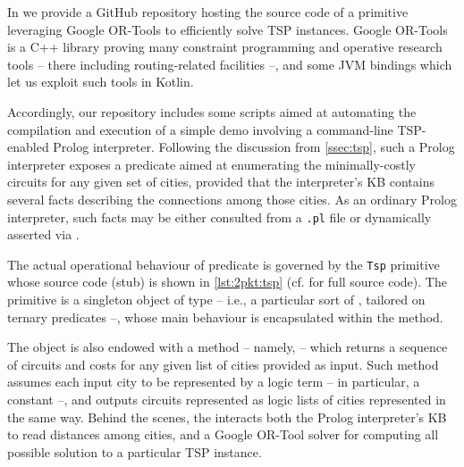 \documentclass[12pt,a4paper,openright,twoside]{book}
\begin{document}
In \cite{2P-Kt-TSP-Example} we provide a GitHub repository hosting the source code of a \twopkt{} primitive leveraging Google OR-Tools \cite{ortools} to efficiently solve TSP instances.
%
Google OR-Tools is a C++ library proving many constraint programming and operative research tools -- there including routing-related facilities --, and some JVM bindings which let us exploit such tools in Kotlin.

Accordingly, our repository includes some scripts aimed at automating the compilation and execution of a simple demo involving a command-line TSP-enabled Prolog interpreter.
%
Following the discussion from \cref{ssec:tsp}, such a Prolog interpreter exposes a  predicate aimed at enumerating the minimally-costly circuits for any given set of cities, provided that the interpreter's KB contains several  facts describing the connections among those cities.
%
As an ordinary Prolog interpreter, such facts may be either consulted from a \texttt{.pl} file or dynamically asserted via .



The actual operational behaviour of predicate  is governed by the \texttt{Tsp} primitive whose source code (stub) is shown in \cref{lst:2pkt:tsp} (cf. \cite{2P-Kt-TSP-Example} for full source code).
%
The  primitive is a singleton object of type  -- i.e., a particular sort of , tailored on ternary predicates --, whose main behaviour is encapsulated within the  method.

The  object is also endowed with a method -- namely,  -- which returns a sequence of circuits and costs for any given list of cities provided as input.
%
Such method assumes each input city to be represented by a logic term -- in particular, a constant --, and outputs circuits represented as logic lists of cities represented in the same way.
%
Behind the scenes, the  interacts both the Prolog interpreter's KB to read distances among cities, and a Google OR-Tool solver for computing all possible solution to a particular TSP instance.
\end{document}
